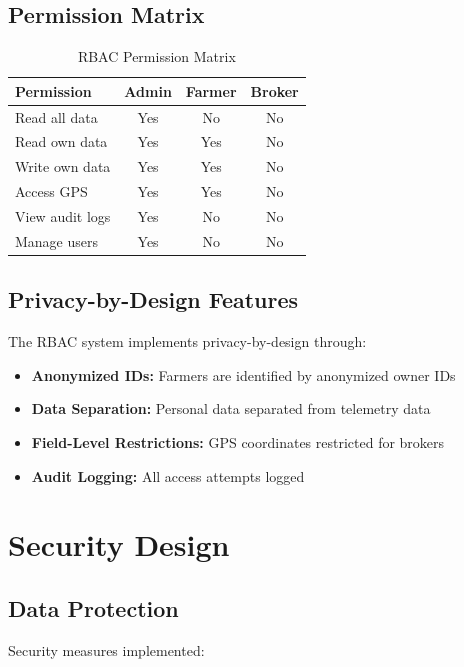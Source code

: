 \subsection{Permission Matrix}

\begin{table}[H]
\centering
\begin{tabular}{|l|c|c|c|}
\hline
\textbf{Permission} & \textbf{Admin} & \textbf{Farmer} & \textbf{Broker} \\
\hline
Read all data & Yes & No & No \\
Read own data & Yes & Yes & No \\
Write own data & Yes & Yes & No \\
Access GPS & Yes & Yes & No \\
View audit logs & Yes & No & No \\
Manage users & Yes & No & No \\
\hline
\end{tabular}
\caption{RBAC Permission Matrix}
\end{table}

\subsection{Privacy-by-Design Features}

The RBAC system implements privacy-by-design through:

\begin{itemize}
    \item \textbf{Anonymized IDs:} Farmers are identified by anonymized owner IDs
    \item \textbf{Data Separation:} Personal data separated from telemetry data
    \item \textbf{Field-Level Restrictions:} GPS coordinates restricted for brokers
    \item \textbf{Audit Logging:} All access attempts logged
\end{itemize}

\section{Security Design}

\subsection{Data Protection}

Security measures implemented:

